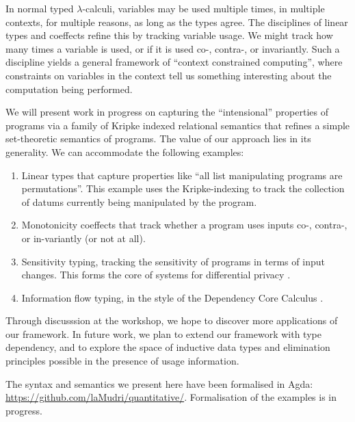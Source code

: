 In normal typed $\lambda$-calculi, variables may be used multiple
times, in multiple contexts, for multiple reasons, as long as the
types agree. The disciplines of linear types \cite{girard87linear} and
coeffects \cite{PetricekOM14,BrunelGMZ14,GhicaS14} refine this by
tracking variable usage. We might track how many times a variable is
used, or if it is used co-, contra-, or invariantly. Such a discipline
yields a general framework of ``context constrained computing'', where
constraints on variables in the context tell us something interesting
about the computation being performed.

We will present work in progress on capturing the ``intensional''
properties of programs via a family of Kripke indexed relational
semantics that refines a simple set-theoretic semantics of
programs. The value of our approach lies in its generality. We can
accommodate the following examples:
\begin{enumerate}
\item Linear types that capture properties like ``all list
  manipulating programs are permutations''. This example uses the
  Kripke-indexing to track the collection of datums currently being
  manipulated by the program.
\item Monotonicity coeffects that track whether a program uses inputs
  co-, contra-, or in-variantly (or not at all).
\item Sensitivity typing, tracking the sensitivity of programs in
  terms of input changes. This forms the core of systems for
  differential privacy \cite{reed10distance}.
\item Information flow typing, in the style of the Dependency Core
  Calculus \cite{abadi99core}.
\end{enumerate}
Through discusssion at the workshop, we hope to discover more
applications of our framework. In future work, we plan to extend our
framework with type dependency, and to explore the space of inductive
data types and elimination principles possible in the presence of
usage information.

The syntax and semantics we present here have been formalised in Agda:
\url{https://github.com/laMudri/quantitative/}. Formalisation of the
examples is in progress.


